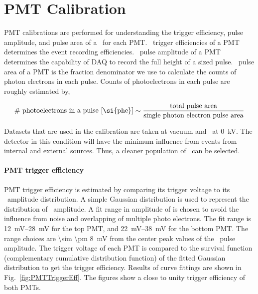 \section{PMT Calibration}
\label{sec:pmt cal} 
PMT calibrations are performed for understanding the trigger efficiency, pulse amplitude, and pulse area of a \sphe\ for each PMT. \sphe\ trigger efficiencies of a PMT determines the event recording efficiencies. \sphe\ pulse amplitude of a PMT determines the capability of DAQ to record the full height of a sized pulse. \sphe\ pulse area of a PMT is the fraction denominator we use to calculate the counts of photon electrons in each pulse. Counts of photoelectrons in each pulse are roughly estimated by, 

\begin{align}
  	\text{\# photoelectrons in a pulse [\si{phe}]} \sim \frac{\text{total pulse area}}{\text{single photon electron pulse area}}
\end{align}     

Datasets that are used in the calibration are taken at vacuum and \opvtvb\ at \SI{0}{\kV}. The detector in this condition will have the minimum influence from events from internal and external sources. Thus, a cleaner population of \sphe\ can be selected. 
  
  
\paragraph{PMT trigger efficiency}
PMT trigger efficiency is estimated by comparing its trigger voltage to its \sphe\ amplitude distribution. A simple Gaussian distribution is used to represent the distribution of \sphe\ amplitude. A fit range in amplitude of is chosen to avoid the influence from noise and overlapping of multiple photo electrons. The fit range is \SIrange{12}{28}{\mV} for the top PMT, and \SIrange{22}{38}{\mV} for the bottom PMT. The range choices are \SI{\sim \pm 8}{\mV} from the center peak values of the \sphe\ pulse amplitude. The trigger voltage of each PMT is compared to the survival function (complementary cumulative distribution function) of the fitted Gaussian distribution to get the trigger efficiency. Results of curve fittings are shown in Fig.~\ref{fig:PMTTriggerEff}. The figures show a close to unity trigger efficiency of both PMTs.
  
